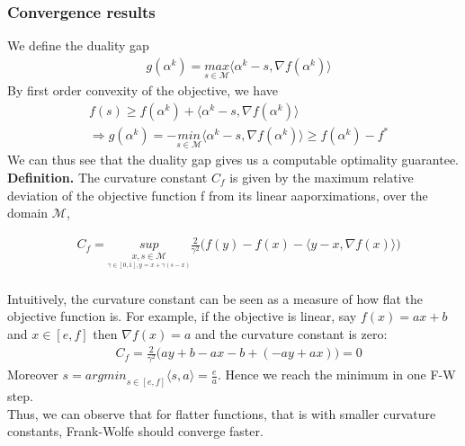 \subsubsection{Convergence results}
We define the duality gap
\begin{equation*}
\begin{aligned}
    &g(\alpha^{k})= \underset{s\in\mathcal{M}}{\textit{max}}\langle \alpha^{k}-s, \nabla f(\alpha^{k})\rangle
\end{aligned}
\end{equation*}
By first order convexity of the objective, we have
\begin{equation*}
\begin{aligned}
    &f(s)\geq f(\alpha^{k})+ \langle \alpha^{k}-s, \nabla f(\alpha^{k})\rangle\\
    &\Longrightarrow g(\alpha^{k})= -\underset{s\in\mathcal{M}}{\textit{min}}\langle \alpha^{k}-s, \nabla f(\alpha^{k})\rangle \geq f(\alpha^{k})- f^{*}
\end{aligned}
\end{equation*}
We can thus see that the duality gap gives us a computable optimality guarantee. \\

\textbf{Definition.} The curvature constant $C_{f}$ is given by the maximum relative deviation of the objective function f from its linear aaporximations, over the domain $\mathcal{M}$,

\begin{equation*}
\begin{aligned}
    &C_{f}= \underset{\underset{ \gamma\in[0,1], y=x+\gamma(s-x)}{x,s\in\mathcal{M}}}{sup}\frac{2}{\gamma^{2}}\Big(f(y)- f(x)- \langle y-x, \nabla f(x)\rangle\Big)
\end{aligned}
\end{equation*}
\\
Intuitively, the curvature constant can be seen as a measure of how flat the objective function is. For example, if the objective is linear, say $f(x)= ax+ b$ and $x\in[e,f]$ then $\nabla f(x)= a$ and the curvature constant is zero:
\begin{equation*}
\begin{aligned}
    &C_{f}= \frac{2}{\gamma^{2}}\Big(ay+ b- ax- b +(-ay +ax)\Big)= 0
\end{aligned}
\end{equation*}
Moreover $s=\textit{argmin}_{s\in[e,f]}\langle s, a\rangle= \frac{e}{a}$. Hence
we reach the minimum in one F-W step.\\ Thus, we can observe that for flatter
functions, that is with smaller curvature
constants, Frank-Wolfe should converge faster. \\

